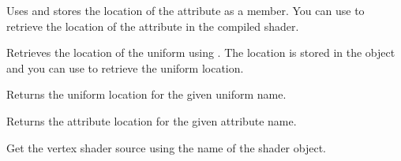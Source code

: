 \documentclass[letterpaper,10pt,english]{sphinxmanual}
\begin{document}

\begin{fulllineitems}
\label{gl:Shader::addAttribute__ssCR}
Uses  and stores the location of the
attribute as a member. You can use  to
retrieve the location of the attribute in the compiled shader.

\end{fulllineitems}


\begin{fulllineitems}
\label{gl:Shader::addUniform__ssCR}
Retrieves the location of the uniform using .
The location is stored in the  object and you can use
 to retrieve the uniform location.

\end{fulllineitems}


\begin{fulllineitems}
\label{gl:Shader::getUniform__ssCR}
Returns the uniform location for the given uniform name.

\end{fulllineitems}


\begin{fulllineitems}
\label{gl:Shader::getAttribute__ssCR}
Returns the attribute location for the given attribute name.

\end{fulllineitems}


\begin{fulllineitems}
\label{gl:Shader::getVertexSource__b}
Get the vertex shader source using the name of the shader object.

\end{fulllineitems}
\end{document}
